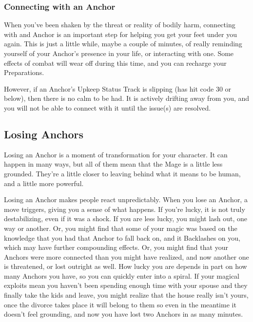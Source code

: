 \documentclass[
  oneside,
  statementpaper,
  9pt]{memoir}
\begin{document}
\hypertarget{connecting-with-an-anchor}{%
\subsubsection{Connecting with an
Anchor}\label{connecting-with-an-anchor}}

\begin{Player}

When you’ve been shaken by the threat or reality of bodily harm, connecting with and Anchor is an important step for helping you get your feet under you again. This is just a little while, maybe a couple of minutes, of really reminding yourself of your Anchor’s presence in your life, or interacting with one. Some effects of combat will wear off during this time, and you can recharge your Preparations.

However, if an Anchor’s Upkeep Status Track is slipping (has hit code 30 or below), then there is no calm to be had. It is actively drifting away from you, and you will not be able to connect with it until the issue(s) are resolved.

\end{Player}

\hypertarget{losing-anchors}{%
\subsection{Losing Anchors}\label{losing-anchors}}

\begin{Player}

Losing an Anchor is a moment of transformation for your character. It can happen in many ways, but all of them mean that the Mage is a little less grounded. They’re a little closer to leaving behind what it means to be human, and a little more powerful.

Losing an Anchor makes people react unpredictably. When you lose an Anchor, a move triggers, giving you a sense of what happens. If you’re lucky, it is not truly destabilizing, even if it was a shock. If you are less lucky, you might lash out, one way or another. Or, you might find that some of your magic was based on the knowledge that you had that Anchor to fall back on, and it Backlashes on you, which may have further compounding effects. Or, you might find that your Anchors were more connected than you might have realized, and now another one is threatened, or lost outright as well. How lucky you are depends in part on how many Anchors you have, so you can quickly enter into a spiral. If your magical exploits mean you haven’t been spending enough time with your spouse and they finally take the kids and leave, you might realize that the house really isn’t yours, once the divorce takes place it will belong to them so even in the meantime it doesn’t feel grounding, and now you have lost two Anchors in as many minutes.

\end{Player}
\end{document}
